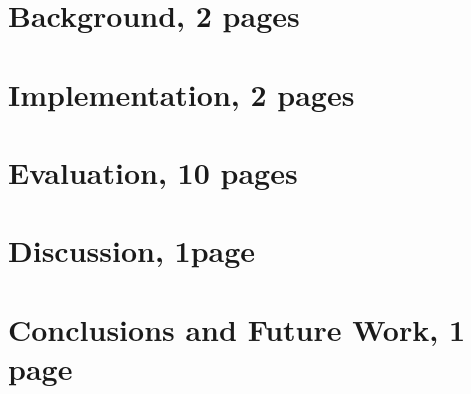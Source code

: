 \documentclass{llncs}
\begin{document}
\section{Background, 2 pages}


\section{Implementation, 2 pages}


\section{Evaluation, 10 pages}




\section{Discussion, 1page}


\section{Conclusions and Future Work, 1 page}




%
%
%
%
%
%
%
\clearpage
%
\end{document}
